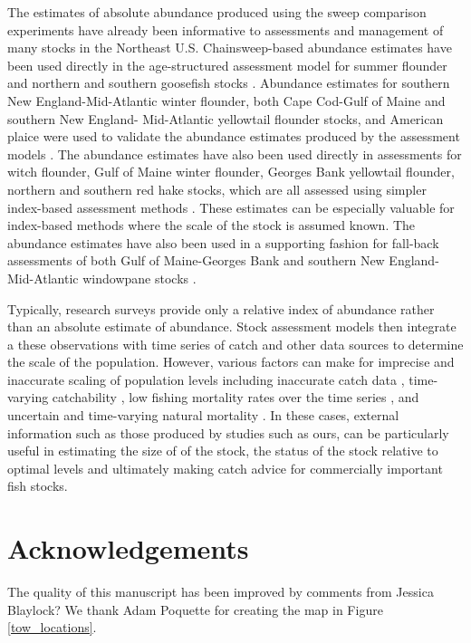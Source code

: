 \documentclass[
  12pt,
]{article}
\begin{document}
The estimates of absolute abundance produced using the sweep comparison
experiments have already been informative to assessments and management
of many stocks in the Northeast U.S. Chainsweep-based abundance
estimates have been used directly in the age-structured assessment model
for summer flounder and northern and southern goosefish stocks
\citep{nefsc19, nefsc20b}. Abundance estimates for southern New
England-Mid-Atlantic winter flounder, both Cape Cod-Gulf of Maine and
southern New England- Mid-Atlantic yellowtail flounder stocks, and
American plaice were used to validate the abundance estimates produced
by the assessment models \citep{nefsc20}. The abundance estimates have
also been used directly in assessments for witch flounder, Gulf of Maine
winter flounder, Georges Bank yellowtail flounder, northern and southern
red hake stocks, which are all assessed using simpler index-based
assessment methods \citep{legaultmccurdy17,nefsc20, nefsc20a}. These
estimates can be especially valuable for index-based methods where the
scale of the stock is assumed known. The abundance estimates have also
been used in a supporting fashion for fall-back assessments of both Gulf
of Maine-Georges Bank and southern New England-Mid-Atlantic windowpane
stocks \citep{nefsc20}.

Typically, research surveys provide only a relative index of abundance
rather than an absolute estimate of abundance. Stock assessment models
then integrate a these observations with time series of catch and other
data sources to determine the scale of the population. However, various
factors can make for imprecise and inaccurate scaling of population
levels including inaccurate catch data \citep{cadigan16}, time-varying
catchability \citep{wilbergetal09}, low fishing mortality rates over the
time series \citep{adamsetal14}, and uncertain and time-varying natural
mortality \citep{stocketal21}. In these cases, external information such
as those produced by studies such as ours, can be particularly useful in
estimating the size of of the stock, the status of the stock relative to
optimal levels and ultimately making catch advice for commercially
important fish stocks.

\hypertarget{acknowledgements}{%
\section*{Acknowledgements}\label{acknowledgements}}

The quality of this manuscript has been improved by comments from
Jessica Blaylock? We thank Adam Poquette for creating the map in Figure
\ref{tow_locations}.
\end{document}
